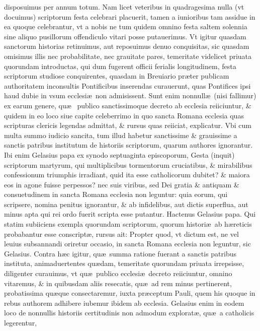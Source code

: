 \documentclass[a5paper,10pt]{book}
\def\ae{æ}
\begin{document}
disposuimus per annum totum.
Nam licet veteribus in quadragesima nulla (vt docuimus) scriptorum %
festa celebrari placuerit, tamen a iunioribus tam assidue in ea quoque celebrantur, vt a nobis ne tum quidem omnino festa saltem solennia sine aliquo pusillorum offendiculo vitari
posse putauerimus.
Vt igitur quasdam sanctorum historias retinuimus, aut reposuimus denuo conquisitas, sic quasdam omisimus illis nec probabilitate, nec grauitate pares, temeritate videlicet priuata quorundam introductas, qui dum fugerent officii ferialis longitudinem, festa scriptorum %
studiose conquirentes, quasdam in Breuiario pr\ae ter publicam authoritatem inconsultis Pontificibus inserendas curauerunt, quas Pontifices ipsi haud dubie in vsum ecclesi\ae \ non admisissent.
Sunt enim nonnull\ae \ (nisi fallimur) ex earum genere, qu\ae \ %
publico sanctissimoque decreto ab ecclesia reiiciuntur, \& quidem in eo loco siue capite celeberrimo in quo sancta Romana ecclesia quas scripturas clericis legendas admittat, \& rursus quas reiiciat, explicatur.
Vbi cum multa summo iudicio sancita, tum illud habetur sanctissime \& grauissime a sanctis patribus institutum de historiis scriptorum, %
quarum authores ignorantur.
Ibi enim Gelasius papa ex synodo septuaginta episcoporum, Gesta (inquit) scriptorum %
martyrum, qui multiplicibus tormentorum cruciatibus, \& mirabilibus confessionum triumphis irradiant, quid ita esse catholicorum dubitet?
\& maiora eos in agone fuisse perpessos?
nec suis viribus, sed Dei gratia \& antiquam \& consuetudinem in sancta Romana ecclesia non leguntur:
quia eorum, qui scripsere, nomina penitus ignorantur, \& ab infidelibus, aut dictis superflua, aut minus apta qui rei ordo fuerit scripta esse putantur.
Hactenus Gelasius papa.
Qui statim subiiciens exempla quorundam scriptorum, %
quorum histori\ae \ ab h\ae reticis probabantur esse conscript\ae , rursus ait:
Propter quod, vt dictum est, ne vel leuius subsannandi oriretur occasio, in sancta Romana ecclesia non leguntur, sic Gelasius.
Contra h\ae c igitur, qu\ae \ summa ratione fuerant a sanctis patribus instituta, animaduertentes qu\ae dam, temeritate quorundam priuata irrepsisse, diligenter curauimus, vt qu\ae \ publico ecclesi\ae \ decreto reiiciuntur, omnino vitaremus, \& in quibusdam aliis resecatis, qu\ae \ ad rem minus pertinerent, probatissima qu\ae que consectaremur, iuxta pr\ae ceptum Pauli, quem his quoque in rebus authorem adhibere iubemur ibidem ab ecclesia.
Gelasius enim in eodem loco de nonnullis historiis certitudinis non admodum explorat\ae , qu\ae \ a catholicis legerentur,
\end{document}
